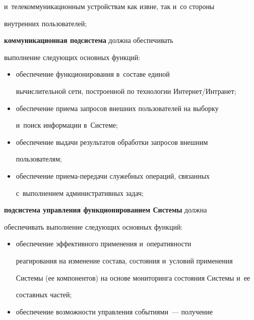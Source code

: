 \begin{description}
\begin{itemize}
и~телекоммуникационным устройствам как извне, так и~со стороны 


внутренних пользователей;


     \end{itemize}


     


 \item[\,]    \textbf{коммуникационная подсистема} должна обеспечивать 


выполнение следующих основных функций:


     \begin{itemize}


     \item  обеспечение функционирования в~составе единой 


вычислительной сети, построенной по технологии Интернет/Интранет;


     \item обеспечение приема запросов внешних пользователей на выборку 


и~поиск информации в~Системе;


     \item обеспечение выдачи результатов обработки запросов внешним 


пользователям;


     \item обеспечение приема-передачи служебных операций, связанных 


с~выполнением административных задач;


     \end{itemize}


     


 \item[\,]    \textbf{подсистема управления функционированием Системы} должна 


обеспечивать выполнение следующих основных функций:


     \begin{itemize}


     \item обеспечение эффективного применения и~оперативности 


реагирования на изменение состава, состояния и~условий применения 


Системы (ее компонентов) на основе мониторинга состояния Системы и~ее 


составных частей;


     \item обеспечение возможности управления событиями~--- получение 



\end{itemize}
\end{description}
